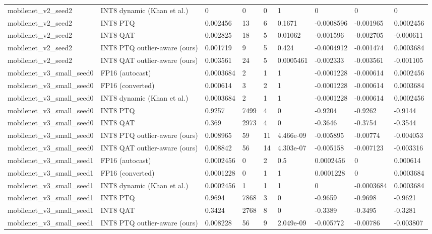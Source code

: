 \begin{table}[t]
\begin{tabular}{lllllllll}
mobilenet\_v2\_seed2 & INT8 dynamic (Khan et al.) & 0 & 0 & 0 & 1 & 0 & 0 & 0 \\
mobilenet\_v2\_seed2 & INT8 PTQ & 0.002456 & 13 & 6 & 0.1671 & -0.0008596 & -0.001965 & 0.0002456 \\
mobilenet\_v2\_seed2 & INT8 QAT & 0.002825 & 18 & 5 & 0.01062 & -0.001596 & -0.002705 & -0.000611 \\
mobilenet\_v2\_seed2 & INT8 PTQ outlier-aware (ours) & 0.001719 & 9 & 5 & 0.424 & -0.0004912 & -0.001474 & 0.0003684 \\
mobilenet\_v2\_seed2 & INT8 QAT outlier-aware (ours) & 0.003561 & 24 & 5 & 0.0005461 & -0.002333 & -0.003561 & -0.001105 \\
mobilenet\_v3\_small\_seed0 & FP16 (autocast) & 0.0003684 & 2 & 1 & 1 & -0.0001228 & -0.000614 & 0.0002456 \\
mobilenet\_v3\_small\_seed0 & FP16 (converted) & 0.000614 & 3 & 2 & 1 & -0.0001228 & -0.000614 & 0.0003684 \\
mobilenet\_v3\_small\_seed0 & INT8 dynamic (Khan et al.) & 0.0003684 & 2 & 1 & 1 & -0.0001228 & -0.000614 & 0.0002456 \\
mobilenet\_v3\_small\_seed0 & INT8 PTQ & 0.9257 & 7499 & 4 & 0 & -0.9204 & -0.9262 & -0.9144 \\
mobilenet\_v3\_small\_seed0 & INT8 QAT & 0.369 & 2973 & 4 & 0 & -0.3646 & -0.3754 & -0.3544 \\
mobilenet\_v3\_small\_seed0 & INT8 PTQ outlier-aware (ours) & 0.008965 & 59 & 11 & 4.466e-09 & -0.005895 & -0.00774 & -0.004053 \\
mobilenet\_v3\_small\_seed0 & INT8 QAT outlier-aware (ours) & 0.008842 & 56 & 14 & 4.303e-07 & -0.005158 & -0.007123 & -0.003316 \\
mobilenet\_v3\_small\_seed1 & FP16 (autocast) & 0.0002456 & 0 & 2 & 0.5 & 0.0002456 & 0 & 0.000614 \\
mobilenet\_v3\_small\_seed1 & FP16 (converted) & 0.0001228 & 0 & 1 & 1 & 0.0001228 & 0 & 0.0003684 \\
mobilenet\_v3\_small\_seed1 & INT8 dynamic (Khan et al.) & 0.0002456 & 1 & 1 & 1 & 0 & -0.0003684 & 0.0003684 \\
mobilenet\_v3\_small\_seed1 & INT8 PTQ & 0.9694 & 7868 & 3 & 0 & -0.9659 & -0.9698 & -0.9621 \\
mobilenet\_v3\_small\_seed1 & INT8 QAT & 0.3424 & 2768 & 8 & 0 & -0.3389 & -0.3495 & -0.3281 \\
mobilenet\_v3\_small\_seed1 & INT8 PTQ outlier-aware (ours) & 0.008228 & 56 & 9 & 2.049e-09 & -0.005772 & -0.00786 & -0.003807 \\

\end{tabular}
\end{table}

